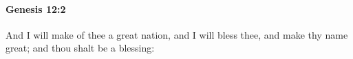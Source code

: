 
		\paragraph{Genesis 12:2} %
			\label{GENESIS-12-2}

			And I will make of thee a great nation, and I will bless thee, and make thy name great; and thou shalt be a blessing:


